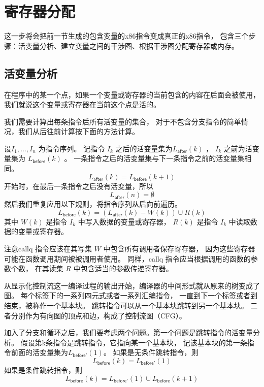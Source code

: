 
\section{寄存器分配}

这一步将会把前一节生成的包含变量的x86指令变成真正的x86指令，
包含三个步骤：活变量分析、建立变量之间的干涉图、根据干涉图分配寄存器或内存。

\subsection{活变量分析}

在程序中的某一个点，如果一个变量或寄存器的当前包含的内容在后面会被使用，
我们就说这个变量或寄存器在当前这个点是活的。

我们需要计算出每条指令后所有活变量的集合，
对于不包含分支指令的简单情况，我们从后往前计算按下面的方法计算。

设$I_1,\ldots, I_n$ 为指令序列。
记指令 $I_k$ 之后的活变量集为$L_{\mathsf{after}}(k)$ ，
 $I_k$ 之前为活变量集为 $L_{\mathsf{before}}(k)$ 。
一条指令之后的活变量集与下一条指令之前的活变量集相同。
\begin{equation} \label{eq:live-after-before-next}
L_{\mathsf{after}}(k) = L_{\mathsf{before}}(k+1)
\end{equation}
开始时，在最后一条指令之后没有活变量，所以
\begin{equation}\label{eq:live-last-empty}
L_{\mathsf{after}}(n) = \emptyset
\end{equation}
然后我们重复应用以下规则，将指令序列从后向前遍历。
\begin{equation}\label{eq:live-before-after-minus-writes-plus-reads}
L_{\mathsf{before}}(k) = (L_{\mathsf{after}}(k) - W(k)) \cup R(k)
\end{equation}
其中 $W(k)$ 是指令 $I_k$ 中写入数据的变量或寄存器，
$R(k)$ 是指令 $I_k$ 中读取数据的变量或寄存器。

注意callq 指令应该在其写集 $W$ 中包含所有调用者保存寄存器，
因为这些寄存器可能在函数调用期间被被调用者使用。
同样，callq 指令应当根据调用的函数的参数个数，
在其读集 $R$ 中包含适当的参数传递寄存器。

从显示化控制流这一编译过程的输出开始，编译器的中间形式就从原来的树变成了图。
每个标签下的一系列四元式或者一系列汇编指令，
一直到下一个标签或者到结束，被称作一个基本块。
跳转指令可以从一个基本块跳转到另一个基本块。
二者分别作为有向图的顶点和边，构成了控制流图（CFG）\cite{Allen_1970}。

加入了分支和循环之后，我们要考虑两个问题。第一个问题是跳转指令的活变量分析。
假设第k条指令是跳转指令，它指向某一个基本块，
记该基本块的第一条指令前面的活变量集为$L_{\mathsf{before'}}(1)$。
如果是无条件跳转指令，则
\begin{equation}\label{eq:live-jmp}
L_{\mathsf{before}}(k) = L_{\mathsf{before'}}(1)
\end{equation}
如果是条件跳转指令，则
\begin{equation}\label{eq:live-jmpcc}
L_{\mathsf{before}}(k) = L_{\mathsf{before'}}(1) \cup L_{\mathsf{before}}(k+1)
\end{equation}

